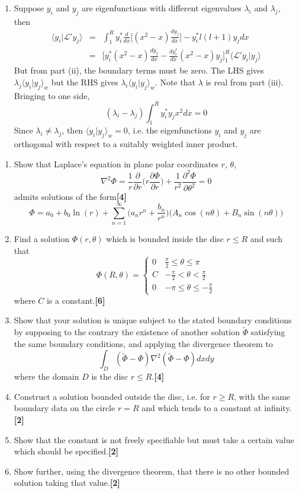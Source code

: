 \documentclass[a4paper]{article}
\begin{document}
\begin{ans}
\begin{enumerate}[label=(\roman*)]
\item Suppose $y_i$ and $y_j$ are eigenfunctions with different eigenvalues $\lambda_i$ and $\lambda_j$, then 
\begin{eqnarray}
\langle y_i|\mathcal{L}'y_j\rangle&=&\int_1^Ry_i^*\frac{d}{dx}\bigg[(x^2-x)\frac{dy_j}{dx}\bigg]-y_i^*l(l+1)y_jdx\nonumber\\&=&\bigg[y_i^*(x^2-x)\frac{dy_j}{dx}-\frac{dy_i^*}{dx}(x^2-x)y_j\bigg]_1^R\langle\mathcal{L}'y_i|y_j\rangle\nonumber
\end{eqnarray}
But from part (ii), the boundary terms must be zero. The LHS gives $\lambda_j\langle y_i|y_j\rangle_w$ but the RHS gives $\lambda_i\langle y_i|y_j\rangle_w$. Note that $\lambda$ is real from part (iii). Bringing to one side,
$$(\lambda_i-\lambda_j)\int_1^Ry_i^*y_jx^2dx=0$$
Since $\lambda_i\neq\lambda_j$, then $\langle y_i|y_j\rangle_w=0$, i.e. the eigenfunctions $y_i$ and $y_j$ are orthogonal with respect to a suitably weighted inner product.
\end{enumerate}
\end{ans}
\begin{qns}\leavevmode
\begin{enumerate}[label=(\roman*)]
    \item Show that Laplace’s equation in plane polar coordinates $r$, $\theta$,
$$\nabla^2\Phi=\frac{1}{r}\frac{\partial}{\partial r}\bigg(r\frac{\partial\Phi}{\partial r}\bigg)+\frac{1}{r^2}\frac{\partial^2\Phi}{\partial\theta^2}=0$$
admits solutions of the form\hfill\textbf{[4]}
$$\Phi=a_0+b_0\ln(r)+\sum_{n=1}^\infty\bigg(a_nr^n+\frac{b_n}{r^n}\bigg)\bigg(A_n\cos(n\theta)+B_n\sin(n\theta)\bigg)$$
\item Find a solution $\Phi(r, \theta)$ which is bounded inside the disc $r\leq R$ and such that 
$$\Phi(R,\theta)=
\left\{
        \begin{array}{ll}
      0 & \frac{\pi}{2}\leq\theta\leq\pi \\
      C & -\frac{\pi}{2}<\theta<\frac{\pi}{2}\\
      0 & -\pi\leq\theta\leq-\frac{\pi}{2}
        \end{array}
    \right.$$
where $C$ is a constant.\hfill\textbf{[6]}
\item Show that your solution is unique subject to the stated boundary conditions by supposing to the contrary the existence of another solution $\tilde{\Phi}$ satisfying the same boundary conditions, and applying the divergence theorem to
$$\int_D(\tilde{\Phi}-\Phi)\nabla^2(\tilde{\Phi}-\Phi)dxdy$$
where the domain $D$ is the disc $r\leq R$.\hfill\textbf{[4]}
\item Construct a solution bounded outside the disc, i.e. for $r \geq R$, with the same boundary data on the circle $r = R$ and which tends to a constant at infinity.\hfill\textbf{[2]}
\item Show that the constant is not freely specifiable but must take a certain value which should be specified.\hfill\textbf{[2]}
\item Show further, using the divergence theorem, that there is no other bounded solution taking that value.\hfill\textbf{[2]}
\end{enumerate}
\end{qns}
\end{document}

